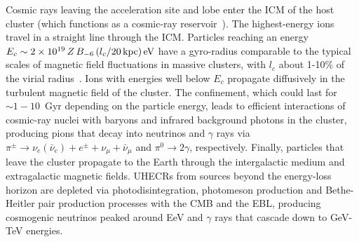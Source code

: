 \documentclass[aps,prd,onecolumn,superscriptaddress,11pt]{revtex4}
\begin{document}
Cosmic rays leaving the acceleration site and lobe enter the ICM of the host cluster (which functions as a cosmic-ray reservoir~\cite{Murase:2008yt,Kotera:2009ms}). The highest-energy ions travel in a straight line through the ICM. Particles reaching an energy $E_{c}\sim2\times10^{19}\,Z\,B_{-6}\,(l_{c}/{20\,\rm kpc})\,\rm eV$ have a gyro-radius comparable to the typical scales of magnetic field fluctuations in massive clusters, with $l_{c}$ about 1-10\% of the virial radius~\cite{2014IJMPD..2330007B}. Ions with energies well below $E_{c}$ propagate diffusively in the turbulent magnetic field of the cluster. The confinement, which could last for $\sim1-10$~Gyr depending on the particle energy, leads to efficient interactions of cosmic-ray nuclei with baryons and infrared background photons in the cluster, producing pions that decay into neutrinos and $\gamma$ rays via $\pi^{\pm}\rightarrow\nu_e(\bar{\nu}_e)+e^\pm+\nu_\mu+\bar{\nu}_\mu$ and $\pi^0\rightarrow2\gamma$, respectively.  
Finally, particles that leave the cluster propagate to the Earth through the intergalactic medium and extragalactic magnetic fields. UHECRs from sources beyond the energy-loss horizon are depleted via photodisintegration, photomeson production and Bethe-Heitler pair production processes with the CMB and the EBL, producing cosmogenic neutrinos peaked around EeV and $\gamma$ rays that cascade down to GeV-TeV energies.
 
\end{document}
